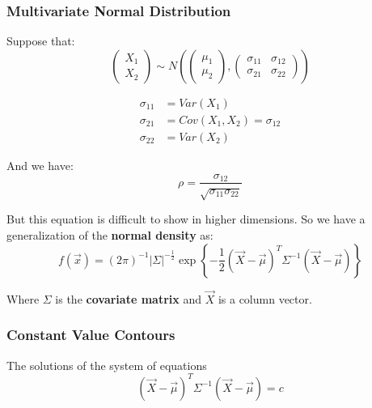 \documentclass{article}
\begin{document}
\subsubsection{Multivariate Normal Distribution}
Suppose that:
\begin{equation*}
    \begin{pmatrix}
        X_1\\
        X_2
    \end{pmatrix} \sim N\left(\begin{pmatrix} \mu_1\\
    \mu_2
    \end{pmatrix}, \begin{pmatrix}\sigma_{11} & \sigma_{12}\\
    \sigma_{21} & \sigma_{22}
    \end{pmatrix}\right)
\end{equation*}

\begin{equation*}
    \begin{split}
        \sigma_{11} &= Var(X_1)\\
        \sigma_{21} &= Cov(X_1,X_2) = \sigma_{12}\\
        \sigma_{22} &= Var(X_2)
    \end{split}
\end{equation*}

And we have:
\begin{equation*}
    \rho = \frac{\sigma_{12}}{\sqrt{\sigma_{11} \sigma_{22}}}
\end{equation*}

\noindent But this equation is difficult to show in higher dimensions. So we have a generalization of the \textbf{normal density} as:
\begin{equation*}
    f(\vec{x}) = (2 \pi)^{-1} \left|\Sigma \right|^{-\frac{1}{2}} \exp \left\{-\frac{1}{2}(\vec{X}-\vec{\mu})^T \Sigma^{-1} (\vec{X}-\vec{\mu}) \right\}
\end{equation*}

Where $\Sigma$ is the \textbf{covariate matrix} and $\vec{X}$ is a column vector.

\subsubsection{Constant Value Contours}

The solutions of the system of equations
\begin{equation*}
    (\vec{X}-\vec{\mu})^T \Sigma^{-1} (\vec{X}-\vec{\mu}) = c
\end{equation*}
\end{document}
